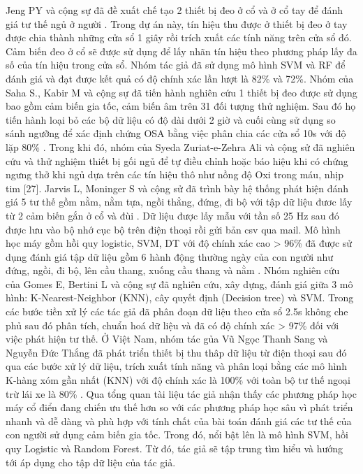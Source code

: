 Jeng PY và cộng sự đã đề xuất chế tạo 2 thiết bị đeo ở cổ và ở cổ tay để đánh giá tư thế ngủ ở người \cite{Jeng}. Trong dự án này, tín hiệu thu được ở thiết bị đeo ở tay được chia thành những cửa sổ 1 giây rồi trích xuất các tính năng trên cửa sổ đó. Cảm biến đeo ở cổ sẽ được sử dụng để lấy nhãn tín hiệu theo phương pháp lấy đa số của tín hiệu trong cửa sổ. Nhóm tác giả đã sử dụng mô hình SVM và RF để đánh giá và đạt được kết quả có độ chính xác lần lượt là 82\% và 72\%. Nhóm của Saha S., Kabir M và cộng sự đã tiến hành nghiên cứu 1 thiết bị đeo được sử dụng bao gồm cảm biến gia tốc, cảm biến âm trên 31 đối tượng thử nghiệm. Sau đó họ tiến hành loại bỏ các bộ dữ liệu có độ dài dưới 2 giờ và cuối cùng sử dụng so sánh ngưỡng để xác định chứng OSA bằng việc phân chia các cửa sổ 10s với độ lặp 80\% \cite{Saha}. Trong khi đó, nhóm của Syeda Zuriat-e-Zehra Ali và cộng sử đã nghiên cứu và thử nghiệm thiết bị gối ngủ để tự điều chỉnh hoặc báo hiệu khi có chứng ngưng thở khi ngủ dựa trên các tín hiệu thô như nồng độ Oxi trong máu, nhịp tim [27]. Jarvis L, Moninger S và cộng sử đã trình bày hệ thống phát hiện đánh giá 5 tư thế gồm nằm, nằm tựa, ngồi thẳng, đứng, đi bộ với tập dữ liệu đươc lấy từ 2 cảm biến gắn ở cổ và đùi \cite{Syeda}. Dữ liệu được lấy mẫu với tần số 25 Hz sau đó được lưu vào bộ nhớ cục bộ trên điện thoại rồi gửi bản csv qua mail. Mô hình học máy gồm hồi quy logistic, SVM, DT với độ chính xác cao > 96\% đã được sử dụng đánh giá tập dữ liệu gồm 6 hành động thường ngày của con người như đứng, ngồi, đi bộ, lên cầu thang, xuống cầu thang và nằm \cite{Uday}. Nhóm nghiên cứu của Gomes E, Bertini L và cộng sự đã nghiên cứu, xây dựng, đánh giá giữa 3 mô hình: K-Nearest-Neighbor (KNN), cây quyết định (Decision tree) và SVM. Trong các bước tiền xử lý các tác giả đã phân đoạn dữ liệu theo cửa sổ 2.5s không che phủ sau đó phân tích, chuẩn hoá dữ liệu và đã có độ chính xác > 97\% đối với việc phát hiện tư thế. Ở Việt Nam, nhóm tác gủa Vũ Ngọc Thanh Sang và Nguyễn Đức Thắng đã phát triển thiết bị thu thâp dữ liệu từ điện thoại sau đó qua các bước xử lý dữ liệu, trích xuất tính năng và phân loại bằng các mô hình K-hàng xóm gần nhất (KNN) với độ chính xác là 100\% với toàn bộ tư thế ngoại trừ lái xe là 80\% \cite{Sang}. Qua tổng quan tài liệu tác giả nhận thấy các phương pháp học máy cổ điển đang chiến ưu thế hơn so với các phương pháp học sâu vì phát triển nhanh và dễ dàng và phù hợp với tính chất của bài toán đánh giá các tư thế của con người sử dụng cảm biến gia tốc. Trong đó, nổi bật lên là mô hình SVM, hồi quy Logistic và Random Forest. Từ đó, tác giả sẽ tập trung tìm hiểu và hướng tới áp dụng cho tập dữ liệu của tác giả.


